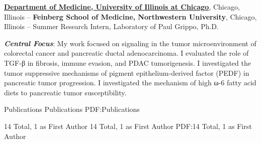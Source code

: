 \documentclass[letterpaper,MMMyyyy,nonstopmode]{simpleresumecv}
\begin{document}
\begin{Body}
\BigGap
\Entry
\href{https://cancer.uillinois.edu/member/paul-grippo/}
{\textbf{Department of Medicine, University of Illinois at Chicago}},
Chicago, Illinois \hfill
{} --
\Entry
\textbf{Feinberg School of Medicine, Northwestern University},
Chicago, Illinois \hfill
{} --
\Gap
\BulletItem
Summer Research Intern, Laboratory of Paul Grippo, Ph.D.
\begin{Detail}
\SubBulletItem
\textbf{\textit{Central Focus}}: My work focused on signaling in the tumor microenvironment of colorectal cancer and pancreatic ductal adenocarcinoma. 
\SubBulletItem
I evaluated the role of TGF-β in fibrosis, immune evasion, and PDAC tumorigenesis. 
\SubBulletItem
I investigated the tumor suppressive mechanisms of pigment epithelium-derived factor (PEDF) in pancreatic tumor progression.
\SubBulletItem
I investigated the mechanism of high ω-6 fatty acid diets to pancreatic tumor susceptibility.
\end{Detail}

\pagebreak


\Section
{Publications}
{Publications}
{PDF:Publications}

\BigGap
\SubSection
{14 Total, 1 as First Author}
{14 Total, 1 as First Author}
{PDF:14 Total, 1 as First Author}


\end{Body}
\end{document}
